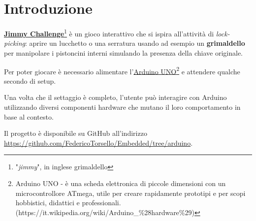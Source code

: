 \chapter{Introduzione}
\href{https://github.com/FedericoTorsello/Embedded/tree/arduino}{\textbf{Jimmy Challenge}}\footnote{"\textit{jimmy}", in inglese grimaldello} è un gioco interattivo che si ispira all'attività di \textit{lock-picking}: aprire un lucchetto o una serratura usando ad esempio un \textbf{grimaldello} per manipolare i pistoncini interni simulando la presenza della chiave originale.

Per poter giocare è necessario alimentare l'\href{https://www.arduino.cc/en/Main/ArduinoBoardUno}{Arduino UNO\footnote{Arduino UNO - è una scheda elettronica di piccole dimensioni con un microcontrollore ATmega, utile per creare rapidamente prototipi e per scopi hobbistici, didattici e professionali. (\url{https://it.wikipedia.org/wiki/Arduino\_\%28hardware\%29})}} e attendere qualche secondo di setup.

Una volta che il settaggio è completo, l'utente può interagire con Arduino utilizzando diversi componenti hardware che mutano il loro comportamento in base al contesto.

Il progetto è disponibile su GitHub all'indirizzo \\\url{https://github.com/FedericoTorsello/Embedded/tree/arduino}.